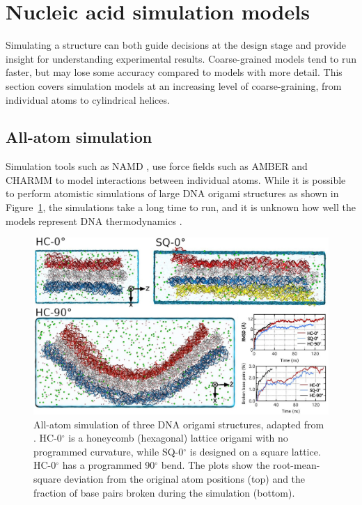 \section{Nucleic acid simulation models}
Simulating a structure can both guide decisions at the design stage and provide insight for understanding experimental results. Coarse-grained models tend to run faster, but may lose some accuracy compared to models with more detail. This section covers simulation models at an increasing level of coarse-graining, from individual atoms to cylindrical helices.

\subsection{All-atom simulation}
Simulation tools such as NAMD \cite{NAMDphillips2005scalable}, use force fields such as AMBER \cite{AMBERcornell1996second} and CHARMM \cite{brooks1983charmm} to model interactions between individual atoms. While it is possible to perform atomistic simulations of large DNA origami structures \cite{yoo2013situ} as shown in Figure~\ref{fig:all-atom}, the simulations take a long time to run, and it is unknown how well the models represent DNA thermodynamics \cite{sengar2021primer}.


\begin{figure}[ht]
  \begin{center}
    \includegraphics[width=\textwidth]{figures/all-atom.jpg}
    \caption{All-atom simulation of three DNA origami structures, adapted from \cite{yoo2013situ}. HC-0$^{\circ}$ is a honeycomb (hexagonal) lattice origami with no programmed curvature, while SQ-0$^{\circ}$ is designed on a square lattice. HC-0$^{\circ}$ has a programmed 90$^{\circ}$ bend. The plots show the root-mean-square deviation from the original atom positions (top) and the fraction of base pairs broken during the simulation (bottom).}
    \label{fig:all-atom}
  \end{center}
\end{figure}

